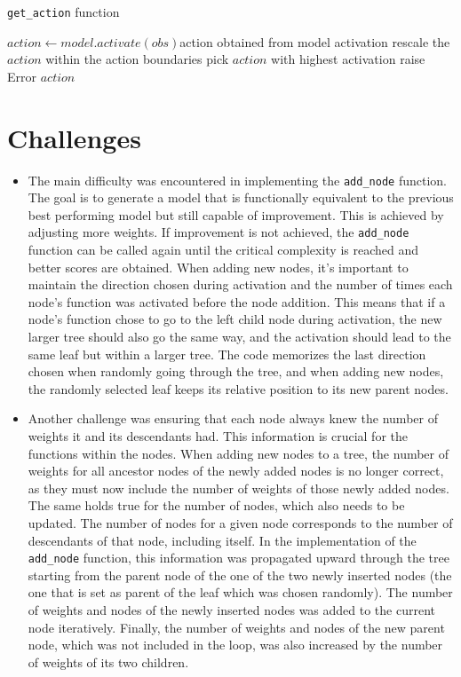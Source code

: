 \begin{algorithm}
\caption{\texttt{get\_action} function}
\label{algo:pseudo_get_action_function}
\begin{algorithmic}
\State $action \gets model.activate(obs)$\Comment action obtained from model activation
    \State rescale the $action$ within the action boundaries
    \State pick $action$ with highest activation
\Else
    \State raise Error
\EndIf
\Return $action$
\EndFunction
\end{algorithmic}
\end{algorithm}

\section{Challenges}

\begin{itemize}
  \item The main difficulty was encountered in implementing the \texttt{add\_node} function. The goal is to generate a model that is functionally equivalent to the previous best performing model but still capable of improvement. This is achieved by adjusting more weights. If improvement is not achieved, the \texttt{add\_node} function can be called again until the critical complexity is reached and better scores are obtained. When adding new nodes, it's important to maintain the direction chosen during activation and the number of times each node's function was activated before the node addition. This means that if a node's function chose to go to the left child node during activation, the new larger tree should also go the same way, and the activation should lead to the same leaf but within a larger tree. The code memorizes the last direction chosen when randomly going through the tree, and when adding new nodes, the randomly selected leaf keeps its relative position to its new parent nodes.

  \item Another challenge was ensuring that each node always knew the number of weights it and its descendants had. This information is crucial for the functions within the nodes. When adding new nodes to a tree, the number of weights for all ancestor nodes of the newly added nodes is no longer correct, as they must now include the number of weights of those newly added nodes. The same holds true for the number of nodes, which also needs to be updated. The number of nodes for a given node corresponds to the number of descendants of that node, including itself. In the implementation of the \texttt{add\_node} function, this information was propagated upward through the tree starting from the parent node of the one of the two newly inserted nodes (the one that is set as parent of the leaf which was chosen randomly). The number of weights and nodes of the newly inserted nodes was added to the current node iteratively. Finally, the number of weights and nodes of the new parent node, which was not included in the loop, was also increased by the number of weights of its two children.
\end{itemize}